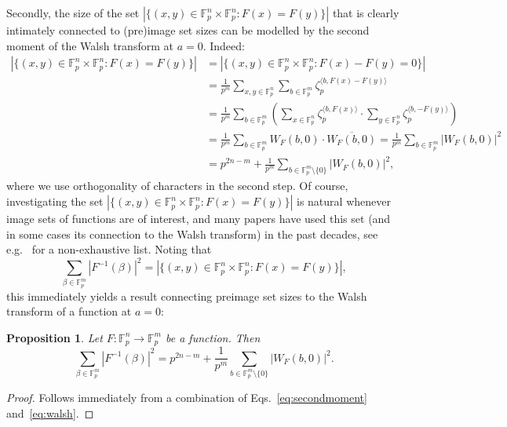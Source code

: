 \documentclass[11pt]{article}
\newcommand{\F}{\mathbb F}
\theoremstyle{plain}
\newtheorem{proposition}[theorem]{Proposition}
\theoremstyle{definition}
\numberwithin{theorem}{section}
\numberwithin{equation}{section}
\numberwithin{table}{section}
\numberwithin{figure}{section}
\begin{document}
{Secondly, the size of the set $|\{(x,y) \in \F_p^n\times \F_p^n \colon F(x)=F(y)\}|$ that is clearly intimately connected to (pre)image set sizes can be modelled by the second moment of the Walsh transform  {at $a=0$}. Indeed:
\begin{align}
       |\{(x,y) \in \F_p^n\times \F_p^n \colon F(x)=F(y)\}|&=|\{(x,y) \in \F_p^n\times \F_p^n \colon F(x)-F(y)=0\}|  \nonumber \\
       &=\frac{1}{p^m}\sum_{x,y \in \F_p^n} \sum_{b \in \F_p^m} \zeta_p^{\langle b,F(x)-F(y) \rangle} \nonumber \\
       &= \frac{1}{p^m} \sum_{b\in \F_p^m} \left(\sum_{x\in \F_p^n} \zeta_p^{\langle b,F(x) \rangle}\cdot \sum_{y\in \F_p^n} \zeta_p^{\langle b,-F(y) \rangle}\right)\nonumber \\
       &=\frac{1}{p^m} \sum_{b \in \F_p^m}W_F(b,0)\cdot \overline{W_F(b,0)} =\frac{1}{p^m} \sum_{b \in \F_p^m} |W_F(b,0)|^2 \nonumber \\
       &=p^{2n-m}+\frac{1}{p^m} \sum_{b \in \F_p^m\setminus\{0\}} |W_F(b,0)|^2, \label{eq:secondmoment}
    \end{align}
     {where we use orthogonality of characters in the second step.}
Of course, investigating the set  $|\{(x,y) \in \F_p^n\times \F_p^n \colon F(x)=F(y)\}|$ is natural whenever image sets of functions are of interest, and many papers have used this set (and in some cases its connection to the Walsh transform) in the past decades, see e.g.~\cite{uchiyama1954nombre,voloch1989number,carlet2007nonlinearities,carlet2011relating,KoelschPolujan2024,Koelsch2023,Coulter2014} for a non-exhaustive list. Noting that 
    \begin{equation} \label{eq:walsh}
        \sum_{\beta \in \F_{p}^m} |F^{-1}(\beta)|^2=|\{(x,y) \in \F_p^n\times \F_p^n \colon F(x)=F(y)\}|,
    \end{equation}
    this immediately yields a result connecting preimage set sizes to the Walsh transform of a function  {at $a=0$}:

\begin{proposition} \label{prop:starting}
Let $F \colon \F_{p}^n \rightarrow \F_{p}^m$ be a function. Then 
\[\sum_{\beta \in \F_{p}^m} |F^{-1}(\beta)|^2 = p^{2n-m}+\frac{1}{p^m} \sum_{b \in \F_p^m\setminus\{0\}} |W_F(b,0)|^2.\]
\end{proposition}
\begin{proof}
    Follows immediately from a combination of Eqs.~\eqref{eq:secondmoment} and~\eqref{eq:walsh}.
    \end{proof}

}
\end{document}
